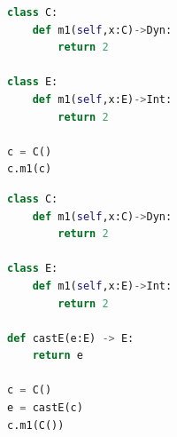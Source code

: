 \documentclass[a4paper,USenglish]{tex/lipics-v2016}
\begin{document}
\begin{lstlisting}[language=python]
class C:
	def m1(self,x:C)->Dyn:
		return 2

class E:
	def m1(self,x:E)->Int:
		return 2

c = C()
c.m1(c)
\end{lstlisting}


\begin{lstlisting}[language=python]
class C:
	def m1(self,x:C)->Dyn:
		return 2

class E:
	def m1(self,x:E)->Int:
		return 2

def castE(e:E) -> E:
	return e

c = C()
e = castE(c)
c.m1(C())
\end{lstlisting}












\end{document}
